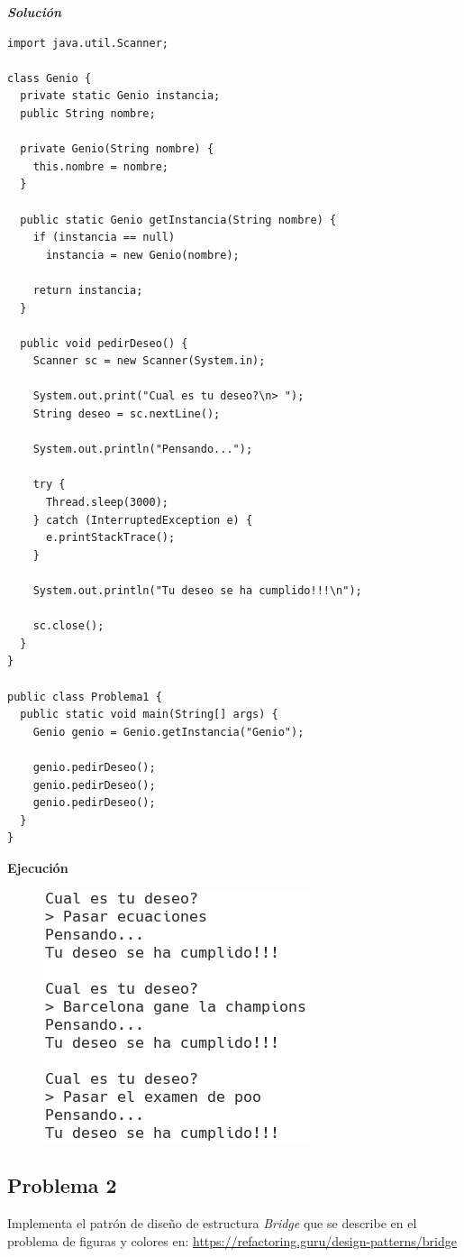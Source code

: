 \documentclass[11pt, twocolumn]{article}
\begin{document}
  \textit{\textbf{Solución}}
  \begin{lstlisting}
import java.util.Scanner;

class Genio {
  private static Genio instancia;
  public String nombre;

  private Genio(String nombre) {
    this.nombre = nombre;
  }

  public static Genio getInstancia(String nombre) {
    if (instancia == null)
      instancia = new Genio(nombre);

    return instancia;
  }

  public void pedirDeseo() {
    Scanner sc = new Scanner(System.in);
    
    System.out.print("Cual es tu deseo?\n> ");
    String deseo = sc.nextLine();

    System.out.println("Pensando...");

    try {
      Thread.sleep(3000);
    } catch (InterruptedException e) {
      e.printStackTrace();
    }

    System.out.println("Tu deseo se ha cumplido!!!\n");

    sc.close();
  }
}

public class Problema1 {
  public static void main(String[] args) {
    Genio genio = Genio.getInstancia("Genio");

    genio.pedirDeseo();
    genio.pedirDeseo();
    genio.pedirDeseo();
  }
}
  \end{lstlisting}

  \textbf{Ejecución}
  \begin{figure}[h!]
    \centering
    \includegraphics[width=0.6\columnwidth]{13P1.png}
  \end{figure}

  \subsection*{Problema 2}
  Implementa el patrón de diseño de estructura \textit{Bridge} que se describe en el problema de figuras y colores en: \url{https://refactoring.guru/design-patterns/bridge}
\end{document}
